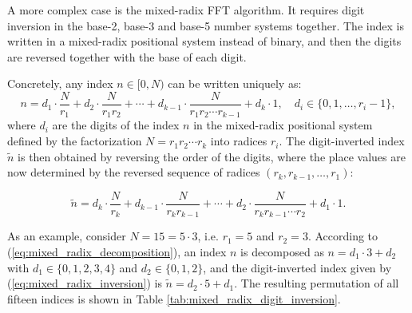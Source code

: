 \documentclass[a4paper,12pt, master]{etf}
\begin{document}
A more complex case is the mixed-radix FFT algorithm. It requires digit inversion in the base-2, base-3 and base-5 number systems together. The index is written in a mixed-radix positional system instead of binary, and then the digits are reversed together with the base of each digit.

Concretely, any index $n \in [0,N)$ can be written uniquely as:
\begin{equation}
    n = d_1 \cdot \frac{N}{r_1} + d_2 \cdot \frac{N}{r_1 r_2} + \cdots + d_{k-1} \cdot \frac{N}{r_1 r_2 \cdots r_{k-1}} + d_k \cdot 1, \quad d_i \in \{0, 1, \ldots, r_i - 1\},
\label{eq:mixed_radix_decomposition}
\end{equation}
where $d_i$ are the digits of the index $n$ in the mixed-radix positional system defined by the factorization $N = r_1 r_2 \cdots r_k$ into radices $r_i$. The digit-inverted index $\tilde{n}$ is then obtained by reversing the order of the digits, where the place values are now determined by the reversed sequence of radices $(r_k, r_{k-1}, \ldots, r_1)$:

\begin{equation}
    \tilde{n} = d_k \cdot \frac{N}{r_k} + d_{k-1} \cdot \frac{N}{r_k r_{k-1}} + \cdots + d_2 \cdot \frac{N}{r_k r_{k-1} \cdots r_2} + d_1 \cdot 1.
\label{eq:mixed_radix_inversion}
\end{equation}

As an example, consider $N = 15 = 5 \cdot 3$, i.e. $r_1 = 5$ and $r_2 = 3$. According to (\ref{eq:mixed_radix_decomposition}), an index $n$ is decomposed as $n = d_1 \cdot 3 + d_2$ with $d_1 \in \{0, 1, 2, 3, 4\}$ and $d_2 \in \{0, 1, 2\}$, and the digit-inverted index given by (\ref{eq:mixed_radix_inversion}) is $\tilde{n} = d_2 \cdot 5 + d_1$. The resulting permutation of all fifteen indices is shown in Table \ref{tab:mixed_radix_digit_inversion}.
\end{document}
